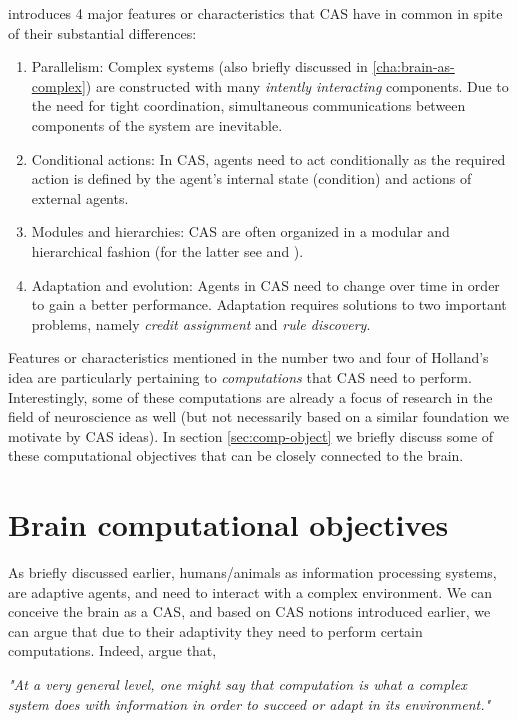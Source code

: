 \citet{hollandStudyingComplexAdaptive2006} introduces 4 major features or characteristics that CAS have in common in spite of their substantial differences:
\begin{enumerate}
\item Parallelism:
  Complex systems (also briefly discussed in \autoref{cha:brain-as-complex}) are constructed with many \emph{intently interacting} components.
  Due to the need for tight coordination, simultaneous communications between components of the system are inevitable.
\item Conditional actions:
  In CAS, agents need to act conditionally as the required action is defined by the agent's internal state (condition) and actions of external agents.
\item Modules and hierarchies:
  CAS are often organized in a modular and hierarchical fashion (for the latter see \cite[Chapter 7]{hollandComplexityVeryShort2014} and \cite[Chapter 8]{hollandSignalsBoundariesBuilding2012a}).
\item Adaptation and evolution:
  Agents in CAS need to change over time in order to gain a better performance.
  Adaptation requires solutions to two important problems, namely \emph{credit assignment} and \emph{rule discovery}.
\end{enumerate}
Features or characteristics mentioned in the number two and four of Holland's idea are particularly pertaining to \emph{computations} that CAS need to perform.
Interestingly, some of these computations are already a focus of research in the field of neuroscience as well
(but not necessarily based on a similar foundation we motivate by CAS ideas).
In section \autoref{sec:comp-object} we briefly discuss some of these computational objectives that can be closely connected to the brain.

\section{Brain computational objectives}\label{sec:comp-object}
As briefly  discussed earlier, humans/animals as information processing systems,
are adaptive agents, and need to interact with a complex environment.
We can conceive the brain as a CAS, and based on CAS notions introduced earlier,
we can argue that due to their adaptivity they need to perform certain computations.
Indeed, \citet[Chapter 12]{mitchellComplexityGuidedTour2011} argue that,
\begin{displayquote}\textsl{
    "At a very general level, one might say that computation is what
    a complex system does with information in order to succeed or adapt in its
    environment."
  }
\end{displayquote}


